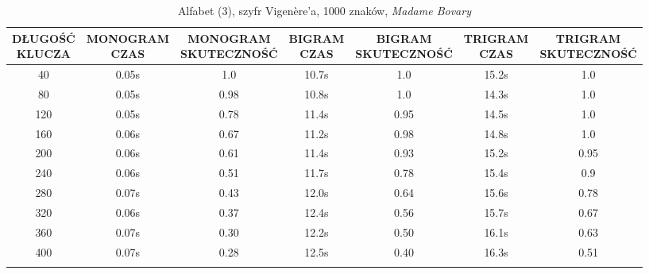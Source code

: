 \documentclass[a4paper]{article}
\theoremstyle{defn}
\theoremstyle{theorem}
\theoremstyle{lemma}
\theoremstyle{cor}
\theoremstyle{fact}
\begin{document}
\begin{center}\begin{small}\begin{longtable}{|c|c|c|c|c|c|c|}
\hline \makecell{DŁUGOŚĆ\\KLUCZA} &  \makecell{MONOGRAM\\CZAS} & \makecell{MONOGRAM\\SKUTECZNOŚĆ} & \makecell{BIGRAM\\CZAS} &  \makecell{BIGRAM\\SKUTECZNOŚĆ} & \makecell{TRIGRAM\\CZAS} & \makecell{TRIGRAM\\SKUTECZNOŚĆ}\\ \hline
40 & 0.05s & 1.0 & 10.7s & 1.0 & 15.2s & 1.0 \\ \hline
80 & 0.05s & 0.98 & 10.8s & 1.0 & 14.3s & 1.0 \\ \hline
120 & 0.05s & 0.78 & 11.4s & 0.95 & 14.5s & 1.0 \\ \hline
160 & 0.06s & 0.67 & 11.2s & 0.98 & 14.8s & 1.0 \\ \hline
200 & 0.06s & 0.61 & 11.4s & 0.93 & 15.2s & 0.95 \\ \hline
240 & 0.06s & 0.51 & 11.7s & 0.78 & 15.4s & 0.9 \\ \hline
280 & 0.07s & 0.43 & 12.0s & 0.64 & 15.6s & 0.78 \\ \hline
320 & 0.06s & 0.37 & 12.4s & 0.56 & 15.7s & 0.67 \\ \hline
360 & 0.07s & 0.30 & 12.2s & 0.50 & 16.1s & 0.63 \\ \hline
400 & 0.07s & 0.28 & 12.5s & 0.40 & 16.3s & 0.51 \\ \hline
\caption{Alfabet (3), szyfr Vigenère'a, 1000 znaków, \textit{Madame Bovary}}
\end{longtable}\end{small}\end{center}
\end{document}
